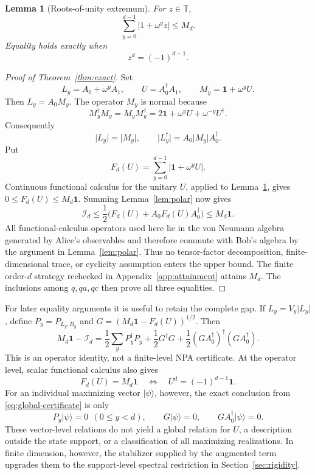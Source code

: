 \documentclass[11pt]{article}
\newtheorem{lemma}[theorem]{Lemma}
\theoremstyle{definition}
\theoremstyle{remark}
\newcommand{\Id}{\mathbf 1}
\newcommand{\cI}{\mathcal I}
\newcommand{\bbT}{\mathbb T}
\newcommand{\absop}[1]{\lvert #1\rvert}
\begin{document}
\begin{lemma}[Roots-of-unity extremum]
\label{lem:scalar}
For \(z\in\bbT\),
\begin{equation}
 \sum_{y=0}^{d-1}\absop{1+\omega^yz}\leq M_d.
 \label{eq:scalar-bound}
\end{equation}
Equality holds exactly when
\begin{equation}
 z^d=(-1)^{d-1}.
 \label{eq:scalar-equality}
\end{equation}
\end{lemma}

\begin{proof}[Proof of Theorem~\ref{thm:exact}]
Set
\[
 L_y=A_0+\omega^yA_1,
 \qquad U=A_0^\dagger A_1,
 \qquad M_y=\Id+\omega^yU.
\]
Then \(L_y=A_0M_y\).  The operator \(M_y\) is normal because
\[
 M_y^\dagger M_y=M_yM_y^\dagger
 =2\Id+\omega^yU+\omega^{-y}U^\dagger.
\]
Consequently
\[
 \absop{L_y}=\absop{M_y},
 \qquad
 \absop{L_y^\dagger}=A_0\absop{M_y}A_0^\dagger.
\]
Put
\[
 F_d(U)=\sum_{y=0}^{d-1}\absop{\Id+\omega^yU}.
\]
Continuous functional calculus for the unitary \(U\), applied to
Lemma~\ref{lem:scalar}, gives \(0\leq F_d(U)\leq M_d\Id\).  Summing
Lemma~\ref{lem:polar} now gives
\[
 \cI_d
 \leq\frac12\bigl(F_d(U)+A_0F_d(U)A_0^\dagger\bigr)
 \leq M_d\Id.
\]
All functional-calculus operators used here lie in the von Neumann algebra
generated by Alice's observables and therefore commute with Bob's algebra by
the argument in Lemma~\ref{lem:polar}.  Thus no tensor-factor decomposition,
finite-dimensional trace, or cyclicity assumption enters the upper bound.
The finite order-\(d\) strategy rechecked in
Appendix~\ref{app:attainment} attains \(M_d\).  The inclusions among
\(q,qa,qc\) then prove all three equalities.
\end{proof}

For later equality arguments it is useful to retain the complete gap.  If
\(L_y=V_y\absop{L_y}\), define \(P_y=P_{L_y,B_y}\) and
\(G=(M_d\Id-F_d(U))^{1/2}\).  Then
\begin{equation}
\boxed{
 M_d\Id-\cI_d
 =\frac12\sum_yP_y^\dagger P_y
 +\frac12G^\dagger G
 +\frac12(GA_0^\dagger)^\dagger(GA_0^\dagger).
}
\label{eq:global-certificate}
\end{equation}
This is an operator identity, not a finite-level NPA certificate.
At the operator level, scalar functional calculus also gives
\[
 F_d(U)=M_d\Id
 \quad\Longleftrightarrow\quad
 U^d=(-1)^{d-1}\Id.
\]
For an individual maximizing vector \(\lvert\psi\rangle\), however, the
exact conclusion from \eqref{eq:global-certificate} is only
\[
 P_y\lvert\psi\rangle=0\ \ (0\leq y<d),\qquad
 G\lvert\psi\rangle=0,\qquad
 GA_0^\dagger\lvert\psi\rangle=0.
\]
These vector-level relations do not yield a global relation for \(U\), a
description outside the state support, or a classification of all maximizing
realizations.  In finite dimension, however, the stabilizer supplied by the
augmented term upgrades them to the support-level spectral restriction in
Section~\ref{sec:rigidity}.
\end{document}
